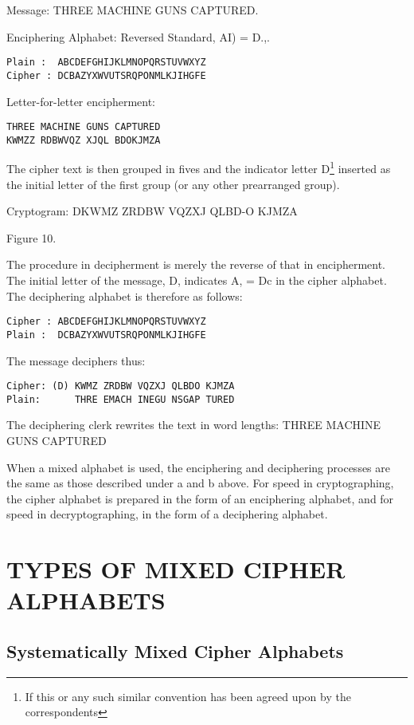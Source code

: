 Message: THREE MACHINE GUNS CAPTURED.

Enciphering Alphabet: Reversed Standard, AI) = D.,.

\begin{verbatim}
Plain :  ABCDEFGHIJKLMNOPQRSTUVWXYZ
Cipher : DCBAZYXWVUTSRQPONMLKJIHGFE
\end{verbatim}

Letter-for-letter encipherment:

\begin{verbatim}
THREE MACHINE GUNS CAPTURED
KWMZZ RDBWVQZ XJQL BDOKJMZA
\end{verbatim}

The cipher text is then grouped in ﬁves and the indicator letter D\footnote{If this or any such similar convention has been agreed upon by the correspondents}
inserted as the initial letter of the ﬁrst group (or any other prearranged
group).

Cryptogram:
DKWMZ ZRDBW VQZXJ QLBD-O KJMZA

Figure 10.

\mypara The procedure in decipherment is merely the reverse of that in
encipherment. The initial letter of the message, D, indicates A, = Dc in
the cipher alphabet. The deciphering alphabet is therefore as follows:

\begin{verbatim}
Cipher : ABCDEFGHIJKLMNOPQRSTUVWXYZ
Plain :  DCBAZYXWVUTSRQPONMLKJIHGFE
\end{verbatim}

The message deciphers thus:
\begin{verbatim}
Cipher: (D) KWMZ ZRDBW VQZXJ QLBDO KJMZA
Plain:      THRE EMACH INEGU NSGAP TURED
\end{verbatim}

The deciphering clerk rewrites the text in word lengths:
THREE MACHINE GUNS CAPTURED

\mypara When a mixed alphabet is used, the enciphering and deciphering
processes are the same as those described under a and b above. For
speed in cryptographing, the cipher alphabet is prepared in the form of
an enciphering alphabet, and for speed in decryptographing, in the form
of a deciphering alphabet.

\section{TYPES OF MIXED CIPHER ALPHABETS}
\subsection{Systematically Mixed Cipher Alphabets}

